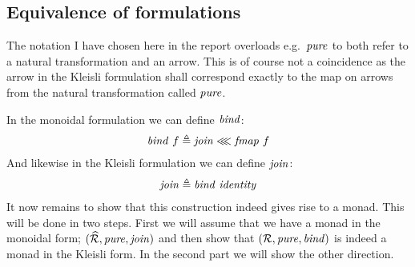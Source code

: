 \subsection{Equivalence of formulations}
%
The notation I have chosen here in the report
overloads e.g.\ $\pure$ to both refer to a natural transformation and an arrow.
This is of course not a coincidence as the arrow in the Kleisli formulation
shall correspond exactly to the map on arrows from the natural transformation
called $\pure$.

In the monoidal formulation we can define $\bind$:
%
\newcommand\joinX{\wideoverbar{\join}}%
\newcommand\bindX{\wideoverbar{\bind}}%
\newcommand\EndoRX{\wideoverbar{\EndoR}}%
\newcommand\pureX{\wideoverbar{\pure}}%
\newcommand\fmapX{\wideoverbar{\fmap}}%
\begin{align}
\bind\ f \defeq \join \lll \fmap\ f
\end{align}
%
And likewise in the Kleisli formulation we can define $\join$:
%
\begin{align}
\join \defeq \bind\ \identity
\end{align}
%
It now remains to show that this construction indeed gives rise to a
monad. This will be done in two steps. First we will assume that we
have a monad in the monoidal form; $(\EndoR, \pure, \join)$ and then
show that $(\omapR, \pure, \bind)$ is indeed a monad in the Kleisli
form. In the second part we will show the other direction.

